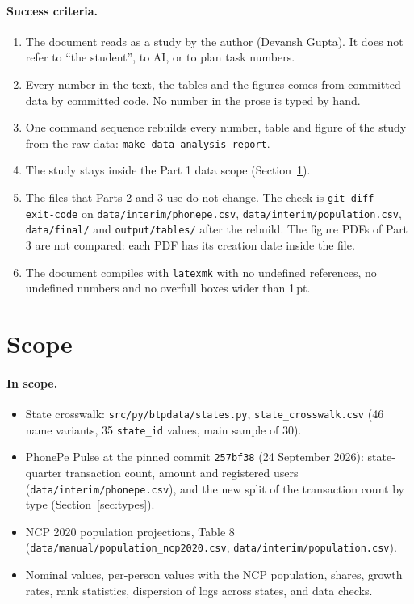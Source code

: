 \documentclass[11pt,a4paper]{article}
\newcommand{\f}[1]{\texttt{#1}}
\begin{document}
\paragraph{Success criteria.}
\begin{enumerate}
  \item The document reads as a study by the author (Devansh Gupta). It does not refer to ``the
        student'', to AI, or to plan task numbers.
  \item Every number in the text, the tables and the figures comes from committed data by committed
        code. No number in the prose is typed by hand.
  \item One command sequence rebuilds every number, table and figure of the study from the raw data:
        \f{make data analysis report}.
  \item The study stays inside the Part 1 data scope (Section~\ref{sec:scope}).
  \item The files that Parts 2 and 3 use do not change. The check is
        \f{git diff --exit-code} on \f{data/interim/phonepe.csv}, \f{data/interim/population.csv},
        \f{data/final/} and \f{output/tables/} after the rebuild. The figure PDFs of Part 3 are not
        compared: each PDF has its creation date inside the file.
  \item The document compiles with \f{latexmk} with no undefined references, no undefined numbers and
        no overfull boxes wider than 1\,pt.
\end{enumerate}

\section{Scope}\label{sec:scope}

\paragraph{In scope.}
\begin{itemize}
  \item State crosswalk: \f{src/py/btpdata/states.py}, \f{state\_crosswalk.csv} (46 name variants, 35
        \f{state\_id} values, main sample of 30).
  \item PhonePe Pulse at the pinned commit \f{257bf38} (24 September 2026): state-quarter transaction
        count, amount and registered users (\f{data/interim/phonepe.csv}), and the new split of the
        transaction count by type (Section~\ref{sec:types}).
  \item NCP 2020 population projections, Table 8 (\f{data/manual/population\_ncp2020.csv},
        \f{data/interim/population.csv}).
  \item Nominal values, per-person values with the NCP population, shares, growth rates, rank
        statistics, dispersion of logs across states, and data checks.
\end{itemize}
\end{document}

